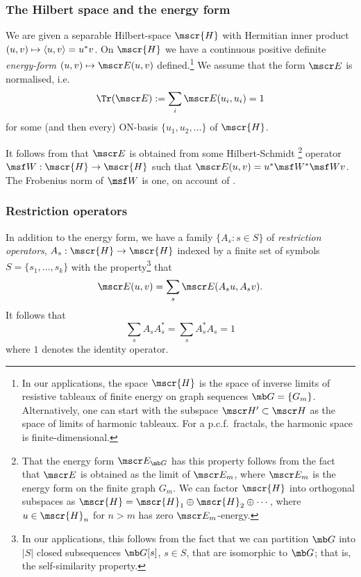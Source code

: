 \documentclass[11pt]{scrartcl}
\renewcommand{\T}{^*}
\renewcommand{\H}{\mscr{H}}
\theoremstyle{plain} %
\theoremstyle{definition}
\begin{document}
\subsubsection{The Hilbert space and the energy form}
 We are
given a separable Hilbert-space $\H$ with Hermitian inner product $(u,v)
\mapsto \left\langle u, v\right\rangle = u^*v$. 
On $\H$ we have a continuous positive
definite \emph{energy-form} $(u,v)\mapsto \mscr E(u,v)$ defined.\footnote{In our
applications, the space $\H$ is the space of inverse limits of
resistive tableaux of finite energy on graph sequences $\mb
G=\{G_m\}$. Alternatively, one can start with the subspace 
$\mscr H' \subset \mscr H$ as the space of limits of harmonic
tableaux. For a p.c.f.\ fractals, the harmonic space is finite-dimensional.}
We assume that the form $\mscr E$ is normalised, i.e.\
\begin{equation}
\Tr(\mscr E) := \sum_i \mscr E( u_i, u_i) = 1
\label{normalisedE}
\end{equation}
for some (and then every) ON-basis $\{ u_1, u_2, \dots \}$ of $\H$. 

It follows from  that  $\mscr E$ is
obtained from some Hilbert-Schmidt \footnote{That the energy form
  $\mscr E_{\mb G}$ has this
  property follows from the fact that $\mscr E$ is obtained as
the limit of $\mscr E_m$, where $\mscr E_m$ is the energy form on the
finite graph $G_m$. We can factor $\H$ into orthogonal subspaces as
$\H=\H_1\oplus\H_2\oplus\cdots$, where $u\in\H_n$ for $n>m$ has
zero $\mscr E_m$-energy.}
operator $\W:\H\to\H$ such that $\mscr E(u,v) = u^*\W^* \W v$. 
The Frobenius norm of $\W$ is one, on account of .  

\subsubsection{Restriction operators}
In addition to the energy form, 
we have a family $\{A_s: s\in S\}$ of \emph{restriction operators},
$A_s:\H \to\H$ indexed by a finite set of symbols
$S=\{s_1,\dots,s_k\}$ with the property\footnote{In our applications, this
follows from the fact that we can partition $\mb G$ into $|S|$
closed subsequences $\mb G[s]$, $s\in S$, that are isomorphic to $\mb G$; that is, the
self-similarity property.}
that 
$$ \mscr E(u,v) = \sum_s \mscr E(A_s u , A_s v). $$
It follows that 
\begin{equation} \label{eqid}
  \sum_s A_s A_s\T = \sum_s A_s\T A_s = 1
\end{equation}
where $1$ denotes the identity operator. 
\end{document}
